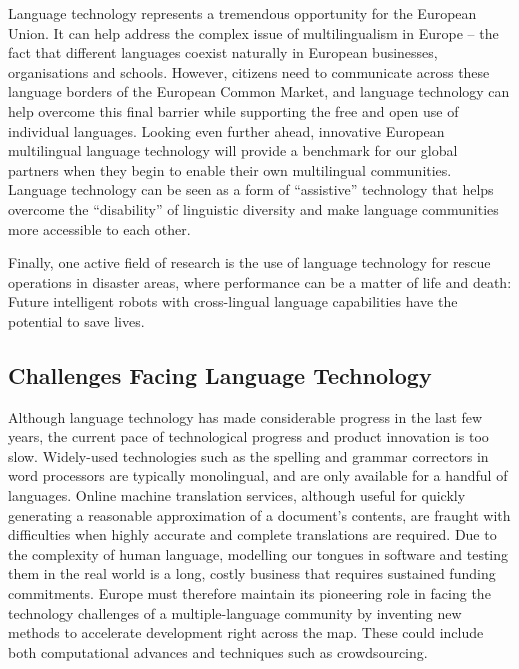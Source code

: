 \begin{multicols}{2}

    Language technology represents a tremendous opportunity for the European Union. It can help address the complex issue of multilingualism in Europe – the fact that different languages coexist naturally in European businesses, organisations and schools. However, citizens need to communicate across these language borders of the European Common Market, and language technology can help overcome this final barrier while supporting the free and open use of individual languages. Looking even further ahead, innovative European multilingual language technology will provide a benchmark for our global partners when they begin to enable their own multilingual communities. Language technology can be seen as a form of ``assistive'' technology that helps overcome the ``disability'' of linguistic diversity and make language communities more accessible to each other.

    Finally, one active field of research is the use of language technology for rescue operations in disaster areas, where performance can be a matter of life and death: Future intelligent robots with cross-lingual language capabilities have the potential to save lives.

\subsection{Challenges Facing Language Technology}

 Although language technology has made considerable progress in the last few years, the current pace of technological progress and product innovation is too slow. 
Widely-used technologies such as the spelling and grammar correctors in word processors are typically monolingual, and are only available for a handful of languages. Online machine translation services, although useful for quickly generating a reasonable approximation of a document’s contents, are fraught with difficulties when highly accurate and complete translations are required. Due to the complexity of human language, modelling our tongues in software and testing them in the real world is a long, costly business that requires sustained funding commitments. Europe must therefore maintain its pioneering role in facing the technology challenges of a multiple-language community by inventing new methods to accelerate development right across the map. These could include both computational advances and techniques such as crowdsourcing.


\end{multicols}
